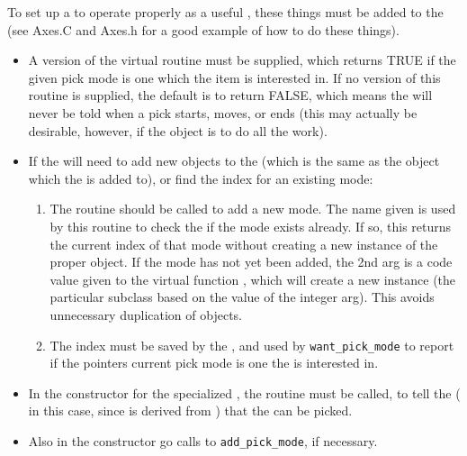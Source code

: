 To set up a  to operate properly as a useful , these things must be added to the  (see Axes.C and Axes.h for a good example of how to do these things).
\begin{itemize}

  \item A version of the virtual routine  must be supplied, which returns TRUE if the given pick mode is one which the item is interested in.  If no version of this routine is supplied, the default is to return FALSE, which means the  will never be told when a pick starts, moves, or ends (this may actually be desirable, however, if the  object is to do all the work).

  \item If the  will need to add new  objects to the  (which is the same as the  object which the  is added to), or find the index for an existing mode:
  \begin{enumerate}
    \item The routine  should be called to add a new mode.  The name given is used by this routine to check the  if the mode exists already.  If so, this returns the current  index of that mode without creating a new instance of the proper  object.  If the mode has not yet been added, the 2nd arg is a code value given to the virtual function , which will create a new  instance (the particular subclass based on the value of the integer arg).  This avoids unnecessary duplication of  objects.
    \item The index must be saved by the , and used by {\tt want\_pick\_mode} to report if the pointers current pick mode is one the  is interested in.
  \end{enumerate}

  \item In the constructor for the specialized , the routine  must be called, to tell the  ( in this case, since  is derived from ) that the  can be picked.

  \item Also in the constructor go calls to {\tt add\_pick\_mode}, if necessary.


\end{itemize}
